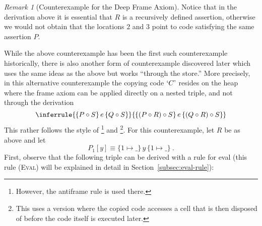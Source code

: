\documentclass{LMCS}
\theoremstyle{remark}
\newtheorem{remark}[theorem]{Remark}
\newcommand{\QUOTE}[1]{\textnormal{`\ensuremath{#1}'}}
\newcommand{\triple}[3]{{\ensuremath{\!\left.\{ #1 \}\, #2\, \{  #3 \}\!\right.}}}
\newcommand{\pointsto}{\ensuremath{\mapsto}}
\begin{document}
\begin{remark}[Counterexample for the Deep Frame Axiom]
Notice that in the derivation above  it is essential that $R$ is a recursively defined assertion, otherwise we would not obtain that the locations $2$ and $3$ point to code satisfying the same  assertion $P$.

While the above counterexample has been the first such counterexample historically, there is also another   form of counterexample discovered later which  uses the same ideas as the above but works ``through the store.'' More precisely,  in this alternative counterexample the copying code $\QUOTE{C}$ resides on the heap where the frame axiom  can  be applied directly on a nested triple, and not through the derivation 
\[
\inferrule
{\triple{P\circ S}{e}{Q\circ S}}
{\triple{(P\circ R)\circ S}{e}{(Q\circ R) \circ S}
}
\]
This rather follows the style of  \cite{Pottier09}\footnote{However, the antiframe rule is used there.} and \cite{CharltonReusLola10}\footnote{This uses a version where the copied code accesses a cell that is then disposed of before the code itself is executed later.}. For this counterexample, let $R$ be as above and let
 $$P_1[y] \equiv  \triple{1{\pointsto}\_}{y}{1{\pointsto}\_}  \ .$$
  First, observe that the following triple can be derived with  a rule for eval (this rule  \textsc{(Eval)} will be explained in detail in Section~\ref{subsec:eval-rule}):
 

\end{remark}
\end{document}
